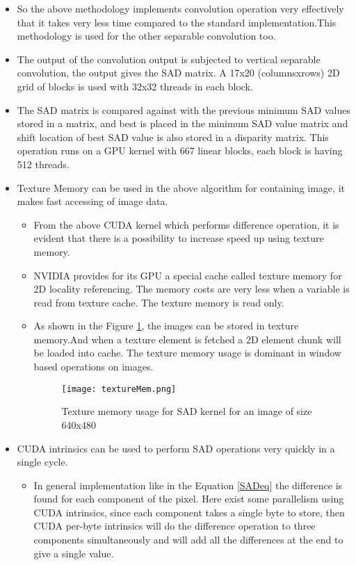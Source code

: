 \begin{itemize}
	\item So the above methodology implements convolution operation very effectively that it takes very less time compared to the standard implementation.This methodology is used for the other separable convolution too.
	\item The output of the convolution output is subjected to vertical separable convolution, the output gives the SAD matrix. A 17x20 (columnsxrows) 2D grid of blocks is used with 32x32 threads in each block.
	\item The SAD matrix is compared against with the previous minimum SAD values stored in a matrix, and best is placed in the minimum SAD value matrix and shift location of best SAD value is also stored in a disparity matrix. This operation runs on a GPU kernel with 667 linear blocks, each block is having 512 threads.
	\item Texture Memory can be used in the above algorithm for containing image, it makes fast accessing of image data. \hfill \break
	\begin{itemize}
		\item From the above CUDA kernel which performs difference operation, it is evident that there is a possibility to increase speed up using texture memory.
		\item NVIDIA provides for its GPU a special cache called texture memory for 2D locality referencing. The memory costs are very less when a variable is read from texture cache. The texture memory is read only.
		\item  As shown in the Figure \ref{fig:Texture}, the images can be stored in texture memory.And when a texture element is fetched a 2D element chunk will be loaded into cache. The texture memory usage is dominant in window based operations on images. 
			\begin{figure}[h!]
				\centering
				\texttt{[image: textureMem.png]}
				\caption{Texture memory usage for SAD kernel for an image of size 640x480}
				\label{fig:Texture}
			\end{figure}
	\end{itemize}
	\item CUDA intrinsics can be used to perform SAD operations very quickly in a single cycle.
	\begin{itemize}
		\item In general implementation like in the Equation \ref{SADeq} the difference is found for each component of the pixel. Here exist some parallelism using CUDA intrinsics, since each component takes a single byte to store, then CUDA per-byte intrinsics will do the difference operation to three components simultaneously and will add all the differences at the end to give a single value.

\end{itemize}
\end{itemize}
